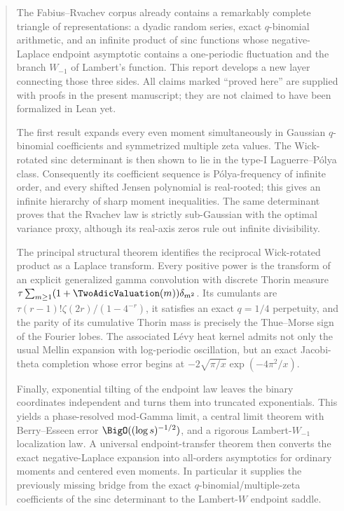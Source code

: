 \documentclass[11pt]{article}
\numberwithin{equation}{section}
\theoremstyle{definition}
\theoremstyle{remark}
\begin{document}
\begin{abstract}
The Fabius--Rvachev corpus already contains a remarkably complete triangle of
representations: a dyadic random series, exact $q$-binomial arithmetic, and an
infinite product of sinc functions whose negative-Laplace endpoint asymptotic
contains a one-periodic fluctuation and the branch $W_{-1}$ of Lambert's
function.  This report develops a new layer connecting those three sides.
All claims marked ``proved here'' are supplied with proofs in the present
manuscript; they are not claimed to have been formalized in Lean yet.

The first result expands every even moment simultaneously in Gaussian
$q$-binomial coefficients and symmetrized multiple zeta values.  The Wick-rotated
sinc determinant is then shown to lie in the type-I Laguerre--P\'olya class.
Consequently its coefficient sequence is P\'olya-frequency of infinite order,
and every shifted Jensen polynomial is real-rooted; this gives an infinite
hierarchy of sharp moment inequalities.  The same determinant proves that the
Rvachev law is strictly sub-Gaussian with the optimal variance proxy, although
its real-axis zeros rule out infinite divisibility.

The principal structural theorem identifies the reciprocal Wick-rotated
product as a Laplace transform.  Every positive power is the transform of an
explicit generalized gamma convolution with discrete Thorin measure
$\tau\sum_{m\ge1}(1+\TwoAdicValuation(m))\delta_{m^2}$.  Its cumulants are
$\tau(r-1)!\zeta(2r)/(1-4^{-r})$, it satisfies an exact $q=1/4$ perpetuity, and
the parity of its cumulative Thorin mass is precisely the Thue--Morse sign of
the Fourier lobes.  The associated L\'evy heat kernel admits not only the usual
Mellin expansion with log-periodic oscillation, but an exact Jacobi-theta
completion whose error begins at
$-2\sqrt{\pi/x}\exp(-4\pi^2/x)$.

Finally, exponential tilting of the endpoint law leaves the binary coordinates
independent and turns them into truncated exponentials.  This yields a
phase-resolved mod-Gamma limit, a central limit theorem with Berry--Esseen error
$\BigO((\log s)^{-1/2})$, and a rigorous Lambert-$W_{-1}$ localization law.  A
universal endpoint-transfer theorem then converts the exact negative-Laplace
expansion into all-orders asymptotics for ordinary moments and centered even
moments.  In particular it supplies the previously missing bridge from the
exact $q$-binomial/multiple-zeta coefficients of the sinc determinant to the
Lambert-$W$ endpoint saddle.
\end{abstract}
\end{document}
